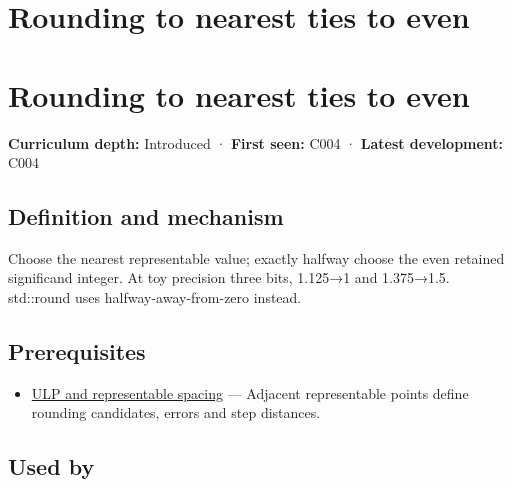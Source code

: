 \hypertarget{appendix-614afe1de592}{}
\section*{Rounding to nearest ties to even}
\section{Rounding to nearest ties to even}\label{appendix-614afe1de592-rounding-to-nearest-ties-to-even}

\textbf{Curriculum depth:} Introduced · \textbf{First seen:} C004 · \textbf{Latest development:} C004

\subsection{Definition and mechanism}\label{appendix-614afe1de592-definition-and-mechanism}

Choose the nearest representable value; exactly halfway choose the even retained significand integer. At toy precision three bits, 1.125→1 and 1.375→1.5. std::round uses halfway-away-from-zero instead.

\subsection{Prerequisites}\label{appendix-614afe1de592-prerequisites}

\begin{itemize}
\tightlist
\item
  \hyperref[appendix-14bab4cab9d4]{ULP and representable spacing} --- Adjacent representable points define rounding candidates, errors and step distances.
\end{itemize}

\subsection{Used by}\label{appendix-614afe1de592-used-by}

